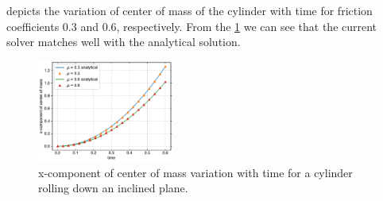  depicts the variation of center of mass of
the cylinder with time for friction coefficients $0.3$ and $0.6$,
respectively. From the \cref{fig:cylinder-xcom-vs-time} we can see that the
current solver matches well with the analytical solution.
\begin{figure}[!htpb]
  \centering
  \includegraphics[width=0.4\textwidth]{figures/rfc/figures/de_2021_cylinder_rolling_on_an_inclined_plane_2d/xcom_vs_time}
  \caption{x-component of center of mass variation with time for a cylinder
    rolling down an inclined plane.}
\label{fig:cylinder-xcom-vs-time}
\end{figure}


\FloatBarrier%
